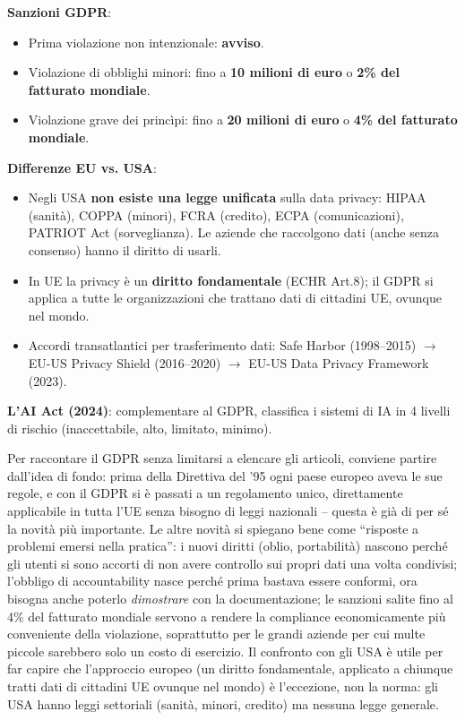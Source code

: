 \documentclass[a4paper,11pt]{article}
\begin{document}
\textbf{Sanzioni GDPR}:
\begin{itemize}
  \item Prima violazione non intenzionale: \textbf{avviso}.
  \item Violazione di obblighi minori: fino a \textbf{10 milioni di euro} o \textbf{2\% del fatturato mondiale}.
  \item Violazione grave dei princìpi: fino a \textbf{20 milioni di euro} o \textbf{4\% del fatturato mondiale}.
\end{itemize}

\textbf{Differenze EU vs. USA}:
\begin{itemize}
  \item Negli USA \textbf{non esiste una legge unificata} sulla data privacy: HIPAA (sanit\`{a}), COPPA (minori), FCRA (credito), ECPA (comunicazioni), PATRIOT Act (sorveglianza). Le aziende che raccolgono dati (anche senza consenso) hanno il diritto di usarli.
  \item In UE la privacy \`{e} un \textbf{diritto fondamentale} (ECHR Art.8); il GDPR si applica a tutte le organizzazioni che trattano dati di cittadini UE, ovunque nel mondo.
  \item Accordi transatlantici per trasferimento dati: Safe Harbor (1998--2015) $\to$ EU-US Privacy Shield (2016--2020) $\to$ EU-US Data Privacy Framework (2023).
\end{itemize}

\textbf{L'AI Act (2024)}: complementare al GDPR, classifica i sistemi di IA in 4 livelli di rischio (inaccettabile, alto, limitato, minimo).

\begin{nota}
Per raccontare il GDPR senza limitarsi a elencare gli articoli, conviene partire dall'idea di fondo: prima della Direttiva del '95 ogni paese europeo aveva le sue regole, e con il GDPR si \`{e} passati a un regolamento unico, direttamente applicabile in tutta l'UE senza bisogno di leggi nazionali -- questa \`{e} gi\`{a} di per s\'{e} la novit\`{a} pi\`{u} importante. Le altre novit\`{a} si spiegano bene come ``risposte a problemi emersi nella pratica'': i nuovi diritti (oblio, portabilit\`{a}) nascono perch\'{e} gli utenti si sono accorti di non avere controllo sui propri dati una volta condivisi; l'obbligo di accountability nasce perch\'{e} prima bastava essere conformi, ora bisogna anche poterlo \emph{dimostrare} con la documentazione; le sanzioni salite fino al 4\% del fatturato mondiale servono a rendere la compliance economicamente pi\`{u} conveniente della violazione, soprattutto per le grandi aziende per cui multe piccole sarebbero solo un costo di esercizio. Il confronto con gli USA \`{e} utile per far capire che l'approccio europeo (un diritto fondamentale, applicato a chiunque tratti dati di cittadini UE ovunque nel mondo) \`{e} l'eccezione, non la norma: gli USA hanno leggi settoriali (sanit\`{a}, minori, credito) ma nessuna legge generale.
\end{nota}
\end{document}
